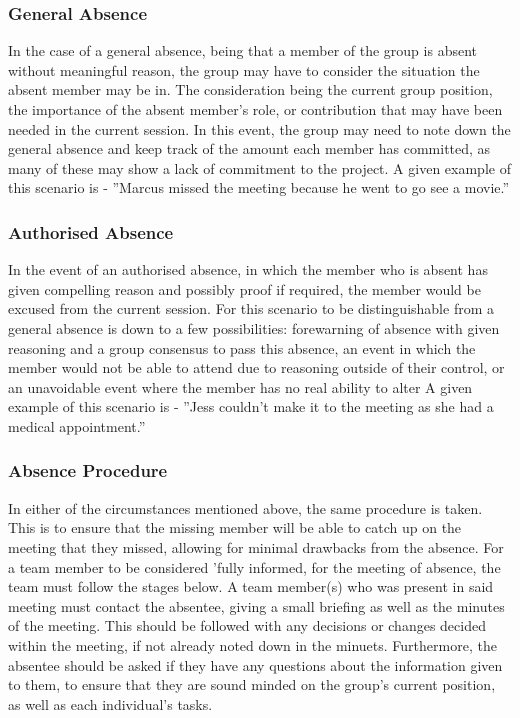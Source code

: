 \documentclass[
  english,
  a4paper,
,tablecaptionabove
]{scrartcl}
\begin{document}
\hypertarget{general-absence}{%
\subsubsection{General Absence}\label{general-absence}}

In the case of a general absence, being that a member of the group is
absent without meaningful reason, the group may have to consider the
situation the absent member may be in. The consideration being the
current group position, the importance of the absent member's role, or
contribution that may have been needed in the current session. In this
event, the group may need to note down the general absence and keep
track of the amount each member has committed, as many of these may show
a lack of commitment to the project. A given example of this scenario is
- ''Marcus missed the meeting because he went to go see a movie.''

\hypertarget{authorised-absence}{%
\subsubsection{Authorised Absence}\label{authorised-absence}}

In the event of an authorised absence, in which the member who is absent
has given compelling reason and possibly proof if required, the member
would be excused from the current session. For this scenario to be
distinguishable from a general absence is down to a few possibilities:
forewarning of absence with given reasoning and a group consensus to
pass this absence, an event in which the member would not be able to
attend due to reasoning outside of their control, or an unavoidable
event where the member has no real ability to alter A given example of
this scenario is - ''Jess couldn't make it to the meeting as she had a
medical appointment.''

\hypertarget{absence-procedure}{%
\subsubsection{Absence Procedure}\label{absence-procedure}}

In either of the circumstances mentioned above, the same procedure is
taken. This is to ensure that the missing member will be able to catch
up on the meeting that they missed, allowing for minimal drawbacks from
the absence. For a team member to be considered 'fully informed, for the
meeting of absence, the team must follow the stages below. A team
member(s) who was present in said meeting must contact the absentee,
giving a small briefing as well as the minutes of the meeting. This
should be followed with any decisions or changes decided within the
meeting, if not already noted down in the minuets. Furthermore, the
absentee should be asked if they have any questions about the
information given to them, to ensure that they are sound minded on the
group's current position, as well as each individual's tasks.
\end{document}
